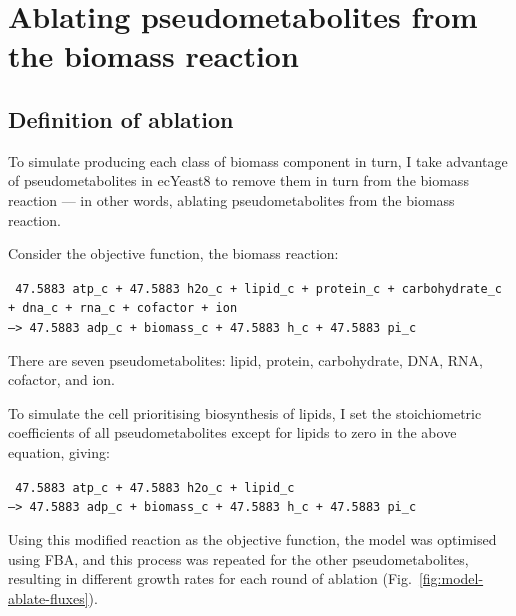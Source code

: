 \section{Ablating pseudometabolites from the biomass reaction}
\label{sec:model-yeast8-pseudometabolites}

\subsection{Definition of ablation}
\label{sec:model-yeast8-pseudometabolites-def}

To simulate producing each class of biomass component in turn,
I take advantage of pseudometabolites in ecYeast8 to remove them in turn from the biomass reaction ---
in other words, ablating pseudometabolites from the biomass reaction.

Consider the objective function, the biomass reaction:

\texttt{
  47.5883 atp\_c + 47.5883 h2o\_c + lipid\_c + protein\_c + carbohydrate\_c\\
  + dna\_c + rna\_c + cofactor + ion \\
  --> 47.5883 adp\_c + biomass\_c + 47.5883 h\_c + 47.5883 pi\_c
}

There are seven pseudometabolites: lipid, protein, carbohydrate, DNA, RNA, cofactor, and ion.

To simulate the cell prioritising biosynthesis of lipids, I set the stoichiometric coefficients of all pseudometabolites except for lipids to zero in the above equation, giving:

\texttt{
  47.5883 atp\_c + 47.5883 h2o\_c + lipid\_c \\
  --> 47.5883 adp\_c + biomass\_c + 47.5883 h\_c + 47.5883 pi\_c
}

Using this modified reaction as the objective function, the model was optimised using FBA, and
this process was repeated for the other pseudometabolites, resulting in different growth rates for each round of ablation (Fig.\ \ref{fig:model-ablate-fluxes}).

